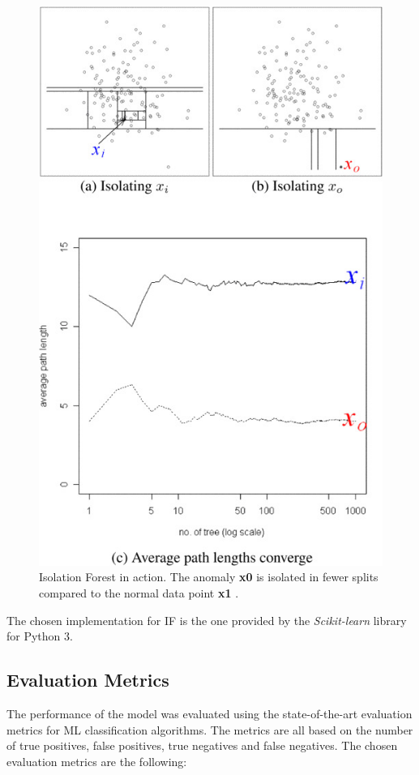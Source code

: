 \documentclass[futureinternet,article,submit,pdftex,moreauthors]{Definitions/mdpi}
\begin{document}
\begin{figure}[H]
	\centering
	\includegraphics[width=6 cm]{img/IsolationForest.jpg}
	\caption{Isolation Forest in action. The anomaly \textbf{x0} is isolated in fewer splits compared to the normal data point \textbf{x1} \cite{IsolationForestLiu}.}
	\label{fig:IsolationForest}
\end{figure}   
\unskip

The chosen implementation for IF is the one provided by the \textit{Scikit-learn} library \cite{IsolationForestScikitLearn} for Python 3. 

\subsection{Evaluation Metrics}\label{EvaluationMetrics}

The performance of the model was evaluated using the state-of-the-art evaluation metrics for ML classification algorithms. The metrics are all based on the number of true positives, false positives, true negatives and false negatives.
The chosen evaluation metrics are the following: 
\end{document}
